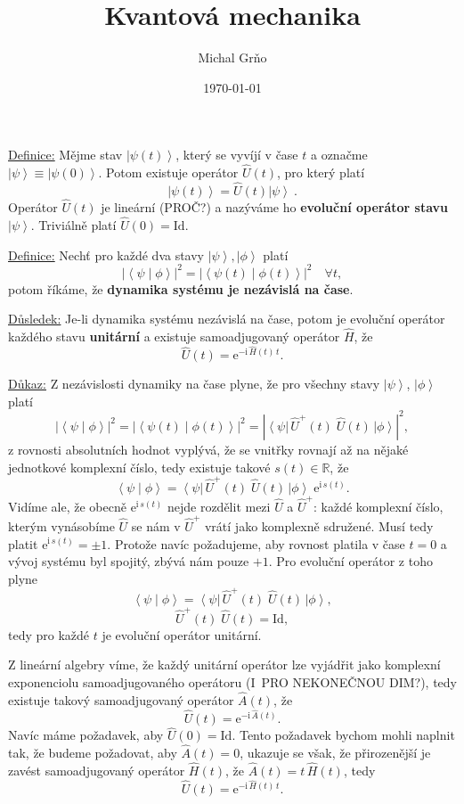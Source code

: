 \documentclass[10pt,a4paper]{article}
\newcommand{\const}[1]{\text{#1}}
\newcommand{\abs}[1]{\left| #1 \right|}
\newcommand{\bra}[1]{\left< #1 \right|}
\newcommand{\ket}[1]{\left| #1 \right>}
\newcommand{\braket}[2]{\left< #1 \middle| #2 \right>}
\newcommand{\e}[1]{\const{e}^{#1}}
\renewcommand{\i}{\const{i}}
\def\R{\mathbb{R}}
\def\1{\const{Id}}
\begin{document}
\title{Kvantová mechanika}
\author{Michal Grňo}
\date{\today}

\maketitle

\underline{Definice:}
Mějme stav $\ket{\psi(t)}$, který se vyvíjí v čase $t$ a označme $\ket{\psi} \equiv \ket{\psi(0)}$. Potom existuje operátor $\hat{U}(t)$, pro který platí $$\ket{\psi(t)} = \hat{U}(t) \ket{\psi} \: .$$ Operátor $\hat{U}(t)$ je lineární (PROČ?) a nazýváme ho \textbf{evoluční operátor stavu} $\ket{\psi}$. Triviálně platí $\hat{U}(0) = \1$.

\vspace{2em}
\underline{Definice:}
Nechť pro každé dva stavy $\ket{\psi}, \ket{\phi}$ platí $$\abs{\braket{\psi}{\phi}}^2 = \abs{\braket{\psi(t)}{\phi(t)}}^2 \quad \forall t,$$ potom říkáme, že \textbf{dynamika systému je nezávislá na čase}.

\vspace{2em}
\underline{Důsledek:}
Je-li dynamika systému nezávislá na čase, potom je evoluční operátor každého stavu \textbf{unitární} a existuje samoadjugovaný operátor $\hat{H}$, že $$\hat{U}(t) = \e{-\i \, \hat{H}(t) \, t}.$$

\underline{Důkaz:}
Z nezávislosti dynamiky na čase plyne, že pro všechny stavy $\ket{\psi}$, $\ket{\phi}$ platí $$\abs{\braket{\psi}{\phi}}^2 = \abs{\braket{\psi(t)}{\phi(t)}}^2 = \abs{\bra{\psi} \, \hat{U}^+\!(t) \; \hat{U}(t) \, \ket{\phi}}^2,$$ z rovnosti absolutních hodnot vyplývá, že se vnitřky rovnají až na nějaké jednotkové komplexní číslo, tedy existuje takové $s(t) \in \R$, že $$\braket{\psi}{\phi} = \bra{\psi} \, \hat{U}^+\!(t) \; \hat{U}(t) \, \ket{\phi} \; \e{\i \, s(t)}.$$ Vidíme ale, že obecně $\e{\i \, s(t)}$ nejde rozdělit mezi $\hat{U}$ a $\hat{U}^+$: každé komplexní číslo, kterým vynásobíme $\hat{U}$ se nám v $\hat{U}^+$ vrátí jako komplexně sdružené. Musí tedy platit $\e{\i \, s(t)} = \pm 1$. Protože navíc požadujeme, aby rovnost platila v čase $t=0$ a vývoj systému byl spojitý, zbývá nám pouze $+1$. Pro evoluční operátor z toho plyne $$\braket{\psi}{\phi} = \bra{\psi} \, \hat{U}^+\!(t) \; \hat{U}(t) \, \ket{\phi},$$ $$\hat{U}^+ \!(t) \; \hat{U}(t) = \1,$$ tedy pro každé $t$ je evoluční operátor unitární.

Z lineární algebry víme, že každý unitární operátor lze vyjádřit jako komplexní exponenciolu samoadjugovaného operátoru (I~PRO NEKONEČNOU DIM?), tedy existuje takový samoadjugovaný operátor $\hat{A}(t)$, že $$\hat{U}(t) = \e{-\i \, \hat{A}(t)}.$$ Navíc máme požadavek, aby $\hat{U}(0) = \1$. Tento požadavek bychom mohli naplnit tak, že budeme požadovat, aby $\hat{A}(t) = 0$, ukazuje se však, že přirozenější je zavést samoadjugovaný operátor $\hat{H}(t)$, že $\hat{A}(t) = t \, \hat{H}(t)$, tedy $$\hat{U}(t) = \e{-\i \, \hat{H}(t) \, t}.$$
\end{document}
